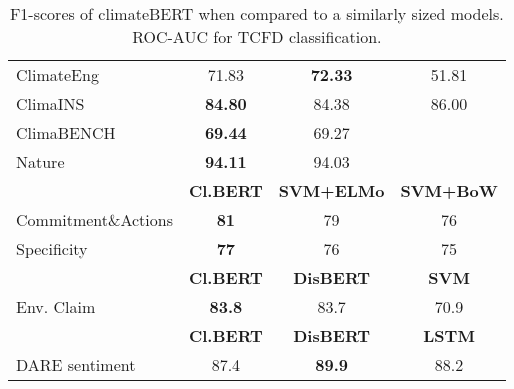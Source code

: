 \begin{table}[ht]
\begin{subtable}[t]{0.46\textwidth}
{\begin{tabular}{lccc}
            ClimateEng \cite{spokoyny2023answering, vaid-etal-2022-towards} & 71.83 & \textbf{72.33} & 51.81 \\
            ClimaINS \cite{spokoyny2023answering} & \textbf{84.80} & 84.38 & 86.00 \\
            ClimaBENCH \cite{spokoyny2023answering} & \textbf{69.44} & 69.27 & \\
            Nature \cite{Schimanski2024nature} & \textbf{94.11} & 94.03 & \\
            \bottomrule
            \toprule
            & \textbf{Cl.BERT} & \textbf{SVM+ELMo} & \textbf{SVM+BoW} \\
            \midrule
            Commitment\&Actions \cite{bingler2023cheaptalkspecificitysentiment} & \textbf{81} & 79 & 76 \\
            Specificity \cite{bingler2023cheaptalkspecificitysentiment} & \textbf{77} & 76 & 75 \\
            \bottomrule
            \toprule
             & \textbf{Cl.BERT} & \textbf{DisBERT} & \textbf{SVM} \\
            \midrule
            Env. Claim \cite{stammbach_environmental_2023} & \textbf{83.8} & 83.7 & 70.9 \\
            \bottomrule
            \toprule
             & \textbf{Cl.BERT} & \textbf{DisBERT} & \textbf{LSTM} \\ %
            \midrule
            DARE sentiment \cite{xiang_dare_2023} & 87.4 & \textbf{89.9} & 88.2 \\
            \bottomrule
        \end{tabular}
        }
    \caption{F1-scores of climateBERT when compared to a similarly sized models. ROC-AUC for TCFD classification.}
    \label{tab:comparison climatebert}
    \end{subtable}  
    \begin{subtable}[t]{0.53\textwidth}
    
        \vspace{-46mm}


\end{subtable}
\end{table}
